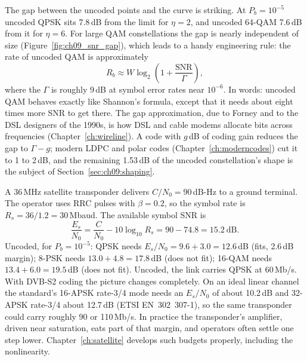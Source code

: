 The gap between the uncoded points and the curve is striking. At $P_b=10^{-5}$ uncoded QPSK sits
7.8\,dB from the limit for $\eta=2$, and uncoded 64-QAM 7.6\,dB from it for $\eta=6$. For large QAM
constellations the gap is nearly independent of size (Figure~\ref{fig:ch09_snr_gap}), which leads
to a handy engineering rule: the rate of uncoded QAM is approximately
\begin{equation}
R_b\approx W\log_2\!\left(1+\frac{\mathrm{SNR}}{\Gamma}\right),
\label{eq:ch09:gap}
\end{equation}
where the  $\Gamma$ is roughly 9\,dB at symbol error rates near $10^{-6}$. In words:
uncoded QAM behaves exactly like Shannon's formula, except that it needs about eight times more
SNR to get there. The gap approximation, due to Forney and to the DSL designers of the 1990s, is
how DSL and cable modems allocate bits across frequencies (Chapter~\ref{ch:wireline}). A code with
$g$\,dB of coding gain reduces the gap to $\Gamma-g$; modern LDPC and polar codes
(Chapter~\ref{ch:moderncodes}) cut it to 1 to 2\,dB, and the remaining 1.53\,dB of the uncoded
constellation's shape is the subject of Section~\ref{sec:ch09:shaping}.


\begin{worked}
A 36\,MHz satellite transponder delivers $C/N_0=90$\,dB-Hz to a ground terminal. The operator
uses RRC pulses with $\beta=0.2$, so the symbol rate is $R_s=36/1.2=30$\,Mbaud. The available
symbol SNR is
\[
\frac{E_s}{N_0}=\frac{C}{N_0}-10\log_{10}R_s=90-74.8=15.2\ \text{dB}.
\]
Uncoded, for $P_b=10^{-5}$: QPSK needs $E_s/N_0=9.6+3.0=12.6$\,dB (fits, 2.6\,dB margin);
8-PSK needs $13.0+4.8=17.8$\,dB (does not fit); 16-QAM needs $13.4+6.0=19.5$\,dB (does not fit).
Uncoded, the link carries QPSK at 60\,Mb/s. With DVB-S2 coding the picture changes completely.
On an ideal linear channel the standard's 16-APSK rate-3/4 mode needs an $E_s/N_0$ of about
10.2\,dB and 32-APSK rate-3/4 about 12.7\,dB (ETSI EN~302~307-1), so the same transponder could
carry roughly 90 or 110\,Mb/s. In practice the transponder's amplifier, driven near saturation,
eats part of that margin, and operators often settle one step lower. Chapter~\ref{ch:satellite}
develops such budgets properly, including the nonlinearity.
\end{worked}

